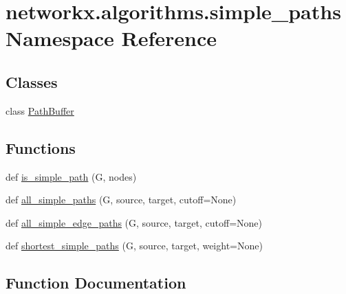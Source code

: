 \hypertarget{namespacenetworkx_1_1algorithms_1_1simple__paths}{}\section{networkx.\+algorithms.\+simple\+\_\+paths Namespace Reference}
\label{namespacenetworkx_1_1algorithms_1_1simple__paths}
\subsection*{Classes}
\begin{DoxyCompactItemize}
\item 
class \hyperlink{classnetworkx_1_1algorithms_1_1simple__paths_1_1PathBuffer}{Path\+Buffer}
\end{DoxyCompactItemize}
\subsection*{Functions}
\begin{DoxyCompactItemize}
\item 
def \hyperlink{namespacenetworkx_1_1algorithms_1_1simple__paths_a2ed07ef1ce2ec6ff72dc537d79a436ed}{is\+\_\+simple\+\_\+path} (G, nodes)
\item 
def \hyperlink{namespacenetworkx_1_1algorithms_1_1simple__paths_ae6810350d1b73083aeeb311ff0ec45e4}{all\+\_\+simple\+\_\+paths} (G, source, target, cutoff=None)
\item 
def \hyperlink{namespacenetworkx_1_1algorithms_1_1simple__paths_a9d4fb436f9e23ad7bc6eef2dd4c95699}{all\+\_\+simple\+\_\+edge\+\_\+paths} (G, source, target, cutoff=None)
\item 
def \hyperlink{namespacenetworkx_1_1algorithms_1_1simple__paths_ac0efdc3cd497758f3090898c351d9221}{shortest\+\_\+simple\+\_\+paths} (G, source, target, weight=None)
\end{DoxyCompactItemize}


\subsection{Function Documentation}
\mbox{\label{namespacenetworkx_1_1algorithms_1_1simple__paths_a9d4fb436f9e23ad7bc6eef2dd4c95699}} 
